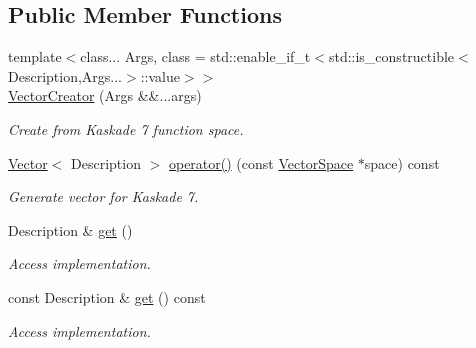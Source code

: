 \subsection*{Public Member Functions}
\begin{DoxyCompactItemize}
\item 
{\footnotesize template$<$class... Args, class  = std\+::enable\+\_\+if\+\_\+t$<$std\+::is\+\_\+constructible$<$\+Description,\+Args...$>$\+::value$>$$>$ }\\\hyperlink{group__VectorSpaceGroup_ga89de372343310640870077e6167df3f4}{Vector\+Creator} (Args \&\&...args)
\begin{DoxyCompactList}\small\item\em Create from Kaskade 7 function space. \end{DoxyCompactList}\item 
\hypertarget{classSpacy_1_1Kaskade_1_1VectorCreator_aaceaab9c73fe2738c9f32eae99953f97}{}\hyperlink{classSpacy_1_1Kaskade_1_1Vector}{Vector}$<$ Description $>$ \hyperlink{classSpacy_1_1Kaskade_1_1VectorCreator_aaceaab9c73fe2738c9f32eae99953f97}{operator()} (const \hyperlink{classSpacy_1_1VectorSpace}{Vector\+Space} $\ast$space) const \label{classSpacy_1_1Kaskade_1_1VectorCreator_aaceaab9c73fe2738c9f32eae99953f97}

\begin{DoxyCompactList}\small\item\em Generate vector for Kaskade 7. \end{DoxyCompactList}\item 
\hypertarget{classSpacy_1_1Mixin_1_1Get_aaa3afedcb9b9e943f81d1686b70417db}{}Description \& \hyperlink{classSpacy_1_1Mixin_1_1Get_aaa3afedcb9b9e943f81d1686b70417db}{get} ()\label{classSpacy_1_1Mixin_1_1Get_aaa3afedcb9b9e943f81d1686b70417db}

\begin{DoxyCompactList}\small\item\em Access implementation. \end{DoxyCompactList}\item 
\hypertarget{classSpacy_1_1Mixin_1_1Get_ab00e550fb3ac8208d0a25e17e705a9fc}{}const Description \& \hyperlink{classSpacy_1_1Mixin_1_1Get_ab00e550fb3ac8208d0a25e17e705a9fc}{get} () const\label{classSpacy_1_1Mixin_1_1Get_ab00e550fb3ac8208d0a25e17e705a9fc}

\begin{DoxyCompactList}\small\item\em Access implementation. \end{DoxyCompactList}\end{DoxyCompactItemize}


